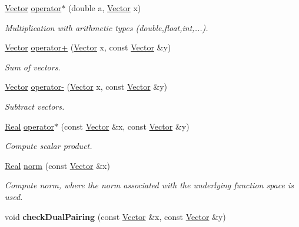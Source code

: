 \begin{DoxyCompactItemize}
\item 
\hyperlink{classSpacy_1_1Vector}{Vector} \hyperlink{group__SpacyGroup_ga9471ec2eaf7138385a168f5f7c61b7f4_ga9471ec2eaf7138385a168f5f7c61b7f4}{operator$\ast$} (double a, \hyperlink{classSpacy_1_1Vector}{Vector} x)
\begin{DoxyCompactList}\small\item\em Multiplication with arithmetic types (double,float,int,...). \end{DoxyCompactList}\item 
\hyperlink{classSpacy_1_1Vector}{Vector} \hyperlink{group__SpacyGroup_ga19486acb05af1627ec49c376b204a61c_ga19486acb05af1627ec49c376b204a61c}{operator+} (\hyperlink{classSpacy_1_1Vector}{Vector} x, const \hyperlink{classSpacy_1_1Vector}{Vector} \&y)
\begin{DoxyCompactList}\small\item\em Sum of vectors. \end{DoxyCompactList}\item 
\hyperlink{classSpacy_1_1Vector}{Vector} \hyperlink{group__SpacyGroup_ga9eaf4be1a4e8f3ee03e4c4fdafa5687d_ga9eaf4be1a4e8f3ee03e4c4fdafa5687d}{operator-\/} (\hyperlink{classSpacy_1_1Vector}{Vector} x, const \hyperlink{classSpacy_1_1Vector}{Vector} \&y)
\begin{DoxyCompactList}\small\item\em Subtract vectors. \end{DoxyCompactList}\item 
\hyperlink{classSpacy_1_1Real}{Real} \hyperlink{group__SpacyGroup_ga1d84603fc2bfbefca6a020b1217519ad_ga1d84603fc2bfbefca6a020b1217519ad}{operator$\ast$} (const \hyperlink{classSpacy_1_1Vector}{Vector} \&x, const \hyperlink{classSpacy_1_1Vector}{Vector} \&y)
\begin{DoxyCompactList}\small\item\em Compute scalar product. \end{DoxyCompactList}\item 
\hyperlink{classSpacy_1_1Real}{Real} \hyperlink{group__SpacyGroup_ga86a4fc266aa19a07b0af16388907354b_ga86a4fc266aa19a07b0af16388907354b}{norm} (const \hyperlink{classSpacy_1_1Vector}{Vector} \&x)
\begin{DoxyCompactList}\small\item\em Compute norm, where the norm associated with the underlying function space is used. \end{DoxyCompactList}\item 
\hypertarget{namespaceSpacy_ac354f06d21282619482e3ef4a841cd76}{}void {\bfseries check\+Dual\+Pairing} (const \hyperlink{classSpacy_1_1Vector}{Vector} \&x, const \hyperlink{classSpacy_1_1Vector}{Vector} \&y)\label{namespaceSpacy_ac354f06d21282619482e3ef4a841cd76}


\end{DoxyCompactItemize}

